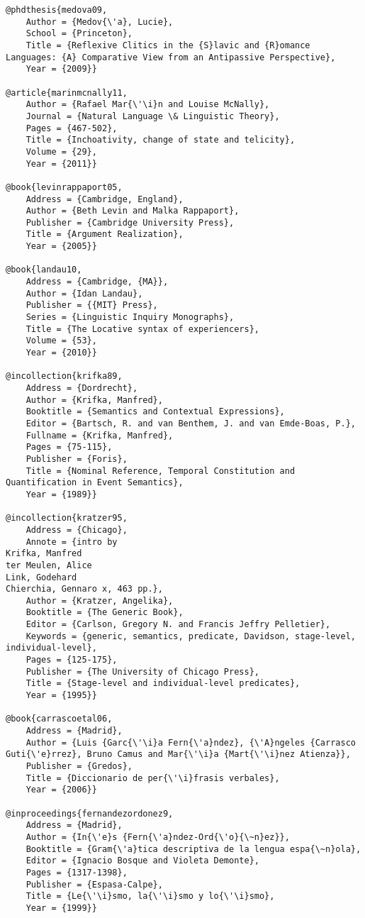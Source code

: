 \documentclass[output=paper,modfonts,nonflat]{langsci/langscibook}
\begin{document}
\begin{verbatim}
@phdthesis{medova09,
	Author = {Medov{\'a}, Lucie},
	School = {Princeton},
	Title = {Reflexive Clitics in the {S}lavic and {R}omance Languages: {A} Comparative View from an Antipassive Perspective},
	Year = {2009}}

@article{marinmcnally11,
	Author = {Rafael Mar{\'\i}n and Louise McNally},
	Journal = {Natural Language \& Linguistic Theory},
	Pages = {467-502},
	Title = {Inchoativity, change of state and telicity},
	Volume = {29},
	Year = {2011}}

@book{levinrappaport05,
	Address = {Cambridge, England},
	Author = {Beth Levin and Malka Rappaport},
	Publisher = {Cambridge University Press},
	Title = {Argument Realization},
	Year = {2005}}

@book{landau10,
	Address = {Cambridge, {MA}},
	Author = {Idan Landau},
	Publisher = {{MIT} Press},
	Series = {Linguistic Inquiry Monographs},
	Title = {The Locative syntax of experiencers},
	Volume = {53},
	Year = {2010}}

@incollection{krifka89,
	Address = {Dordrecht},
	Author = {Krifka, Manfred},
	Booktitle = {Semantics and Contextual Expressions},
	Editor = {Bartsch, R. and van Benthem, J. and van Emde-Boas, P.},
	Fullname = {Krifka, Manfred},
	Pages = {75-115},
	Publisher = {Foris},
	Title = {Nominal Reference, Temporal Constitution and Quantification in Event Semantics},
	Year = {1989}}

@incollection{kratzer95,
	Address = {Chicago},
	Annote = {intro by
Krifka, Manfred
ter Meulen, Alice
Link, Godehard
Chierchia, Gennaro x, 463 pp.},
	Author = {Kratzer, Angelika},
	Booktitle = {The Generic Book},
	Editor = {Carlson, Gregory N. and Francis Jeffry Pelletier},
	Keywords = {generic, semantics, predicate, Davidson, stage-level, individual-level},
	Pages = {125-175},
	Publisher = {The University of Chicago Press},
	Title = {Stage-level and individual-level predicates},
	Year = {1995}}

@book{carrascoetal06,
	Address = {Madrid},
	Author = {Luis {Garc{\'\i}a Fern{\'a}ndez}, {\'A}ngeles {Carrasco Guti{\'e}rrez}, Bruno Camus and Mar{\'\i}a {Mart{\'\i}nez Atienza}},
	Publisher = {Gredos},
	Title = {Diccionario de per{\'\i}frasis verbales},
	Year = {2006}}

@inproceedings{fernandezordonez9,
	Address = {Madrid},
	Author = {In{\'e}s {Fern{\'a}ndez-Ord{\'o}{\~n}ez}},
	Booktitle = {Gram{\'a}tica descriptiva de la lengua espa{\~n}ola},
	Editor = {Ignacio Bosque and Violeta Demonte},
	Pages = {1317-1398},
	Publisher = {Espasa-Calpe},
	Title = {Le{\'\i}smo, la{\'\i}smo y lo{\'\i}smo},
	Year = {1999}}


\end{verbatim}
\end{document}
